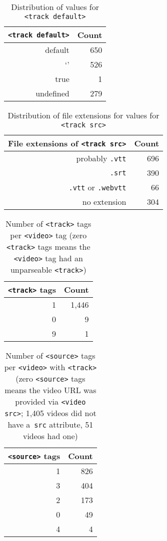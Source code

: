 \documentclass{sig-alternate}
\begin{document}
\begin{table}[p]
  \centering
  \begin{tabular}{ r | r }                       
    \texttt{<track default>} & Count \\
    \hline
    default & 650\\
    `' & 526\\
    true & 1\\
    undefined & 279
  \end{tabular}
  \caption{Distribution of values for
    \texttt{<track default>}}
  \label{table:default}    
\end{table}

\begin{table}[p]
  \centering
  \begin{tabular}{ r | r }                       
    File extensions of \texttt{<track src>} & Count \\
    \hline
    probably \texttt{.vtt} & 696\\
    \texttt{.srt} & 390\\
    \texttt{.vtt} or \texttt{.webvtt} & 66\\
    no extension & 304\\
  \end{tabular}
  \caption{Distribution of file extensions for
    values for \texttt{<track src>}}
  \label{table:src}    
\end{table}

\begin{table}[p]
  \centering
  \begin{tabular}{ r | r }                       
    \texttt{<track>} tags & Count \\
    \hline
    1 & 1,446\\
    0 & 9\\
    9 & 1\\
  \end{tabular}
  \caption{Number of \texttt{<track>} tags per
    \texttt{<video>} tag \tiny (zero \texttt{<track>}
    tags means  the \texttt{<video>} tag had
    an  unparseable \texttt{<track>})}
  \label{table:track}    
\end{table}

\begin{table}[p]
  \centering
  \begin{tabular}{ r | r }
    \texttt{<source>} tags & Count \\
    \hline
    1 & 826\\    
    3 & 404\\    
    2 & 173\\    
    0 & 49\\
    4 & 4\\
  \end{tabular}
  \caption{Number of \texttt{<source>} tags per
    \texttt{<video>} with \texttt{<track>} \tiny (zero \texttt{<source>}
    tags means the video URL was provided via
    \texttt{<video src>}; 1,405 videos did not have
    a~\texttt{src} attribute, 51 videos had one)}
  \label{table:source}    
\end{table}
\end{document}
